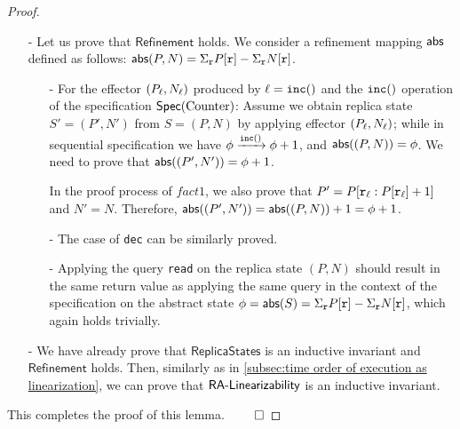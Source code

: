 \begin {proof}
\begin{itemize}
Since every operation is appended to the linearization when it executes atSource it clearly follows, the linearization order is consistent with visibility order. Then, by the causal delivery assumption, the order in which effectors are applied at a given replica is also consistent with the visibility order. Let $\alinord_1$ be the projection of linearization order into labels of effectors applied in a replica $\arep$, and $\alinord_2$ be the order of labels of effectors applied in replica $\arep$. By Lemma \ref{lemma:given two sequence consistent with visibility order, one can be obtained from the other}, $\alinord_2$ can be obtained from $\alinord_1$ by several time of swapping adjacent pair of concurrent operations. It is obvious that applying effectors of concurrent operations commute. Therefore, we know that $\mathsf{ReplicaStates}$ is an inductive invariant.


\item[-] Let us prove that $\mathsf{Refinement}$ holds. We consider a refinement mapping $\refmap$ defined as follows: $\refmap(P,N) = \Sigma_{\arep} P[\arep] - \Sigma_{\arep} N[\arep]$.

    \begin{itemize}
    \setlength{\itemsep}{0.5pt}
    \item[-] For the effector $(P_{\alabel},N_{\alabel})$ produced by $\alabel = \alabelshort[{\tt inc}]{}$ and the $\alabelshort[{\tt inc}]{}$ operation of the specification $\specCounter$: Assume we obtain replica state $S'=(P',N')$ from $S=(P,N)$ by applying effector $(P_{\alabel},N_{\alabel})$; while in sequential specification we have $\abstate \xrightarrow{\alabelshort[{\tt inc}]{}} \abstate+1$, and $\refmap((P,N)) = \abstate$. We need to prove that $\refmap((P',N')) = \abstate+1$.

        In the proof process of $fact1$, we also prove that $P' = P[\arep_{\alabel}: P[\arep_{\alabel}]+1]$ and $N' = N$. Therefore, $\refmap((P',N')) = \refmap((P,N))+1 = \abstate+1$.

    \item[-] The case of {\tt dec} can be similarly proved.

    \item[-] Applying the query {\tt read} on the replica state $(P,N)$ should result in the same return value as applying the same query in the context of the specification on the abstract state $\abstate = \refmap(S) = \Sigma_{\arep} P[\arep] - \Sigma_{\arep} N[\arep]$, which again holds trivially.
    \end{itemize}

\item[-] We have already prove that $\mathsf{ReplicaStates}$ is an inductive invariant and $\mathsf{Refinement}$ holds. Then, similarly as in \sectionautorefname \ref{subsec:time order of execution as linearization}, we can prove that $\mathsf{\CRDTLinshort{}}$ is an inductive invariant.
\end{itemize}

This completes the proof of this lemma. $\qed$
\end {proof}








